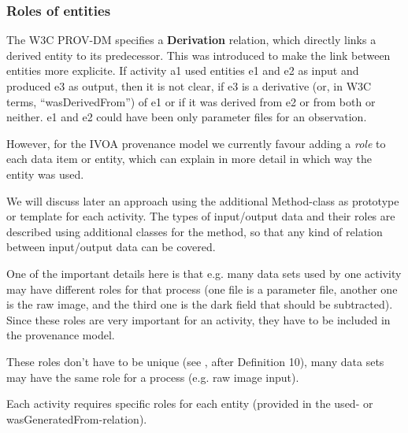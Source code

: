 



\subsubsection{Roles of entities}
The W3C PROV-DM specifies a \textbf{Derivation} relation, which directly links a derived entity to its predecessor. This was introduced to make the link between entities more explicite. If activity a1 used entities e1 and e2 as input and produced e3 as output, then it is not clear, if e3 is a derivative (or, in W3C terms, ``wasDerivedFrom'') of e1 or if it was derived from e2 or from both or neither. e1 and e2 could have been only parameter files for an observation.  

However, for the IVOA provenance model we currently favour adding a \emph{role} to each data item or entity, which can explain in more detail in which way the entity was used.

We will discuss later an approach using the additional Method-class as prototype or template for each activity.
The types of input/output data and their roles are described using additional classes for the method, so that any kind of relation between input/output data can be covered.

One of the important details here is that e.g. many data sets used by one activity may have different roles for that process (one file is a parameter file, another one is the raw image, and the third one is the dark field that should be subtracted). Since these roles are very important for an activity, they have to be included in the provenance model.

These roles don't have to be unique (see \cite{moreau2010}, after Definition 10), many data sets may have the same role for a process (e.g. raw image input).

Each activity requires specific roles for each entity (provided in the used- or wasGeneratedFrom-relation). 

